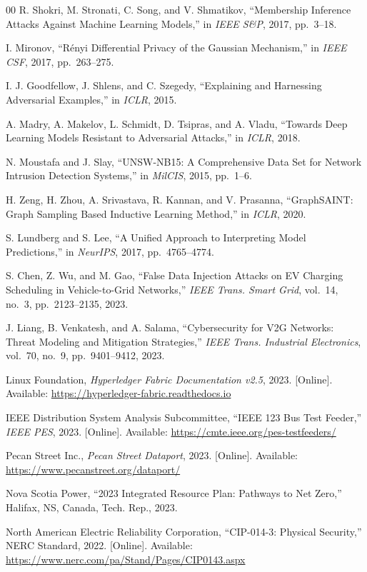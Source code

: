 \documentclass[journal]{IEEEtran}
\begin{document}
\begin{thebibliography}{00}
 R. Shokri, M. Stronati, C. Song, and V. Shmatikov, ``Membership Inference Attacks Against Machine Learning Models,'' in \textit{IEEE S\&P}, 2017, pp.~3--18.

 I. Mironov, ``R\'{e}nyi Differential Privacy of the Gaussian Mechanism,'' in \textit{IEEE CSF}, 2017, pp.~263--275.

 I. J. Goodfellow, J. Shlens, and C. Szegedy, ``Explaining and Harnessing Adversarial Examples,'' in \textit{ICLR}, 2015.

 A. Madry, A. Makelov, L. Schmidt, D. Tsipras, and A. Vladu, ``Towards Deep Learning Models Resistant to Adversarial Attacks,'' in \textit{ICLR}, 2018.

 N. Moustafa and J. Slay, ``UNSW-NB15: A Comprehensive Data Set for Network Intrusion Detection Systems,'' in \textit{MilCIS}, 2015, pp.~1--6.

 H. Zeng, H. Zhou, A. Srivastava, R. Kannan, and V. Prasanna, ``GraphSAINT: Graph Sampling Based Inductive Learning Method,'' in \textit{ICLR}, 2020.

 S. Lundberg and S. Lee, ``A Unified Approach to Interpreting Model Predictions,'' in \textit{NeurIPS}, 2017, pp.~4765--4774.

 S. Chen, Z. Wu, and M. Gao, ``False Data Injection Attacks on EV Charging Scheduling in Vehicle-to-Grid Networks,'' \textit{IEEE Trans. Smart Grid}, vol.~14, no.~3, pp.~2123--2135, 2023.

 J. Liang, B. Venkatesh, and A. Salama, ``Cybersecurity for V2G Networks: Threat Modeling and Mitigation Strategies,'' \textit{IEEE Trans. Industrial Electronics}, vol.~70, no.~9, pp.~9401--9412, 2023.

 Linux Foundation, \textit{Hyperledger Fabric Documentation v2.5}, 2023. [Online]. Available: \url{https://hyperledger-fabric.readthedocs.io}

 IEEE Distribution System Analysis Subcommittee, ``IEEE 123 Bus Test Feeder,'' \textit{IEEE PES}, 2023. [Online]. Available: \url{https://cmte.ieee.org/pes-testfeeders/}

 Pecan Street Inc., \textit{Pecan Street Dataport}, 2023. [Online]. Available: \url{https://www.pecanstreet.org/dataport/}

 Nova Scotia Power, ``2023 Integrated Resource Plan: Pathways to Net Zero,'' Halifax, NS, Canada, Tech. Rep., 2023.

 North American Electric Reliability Corporation, ``CIP-014-3: Physical Security,'' NERC Standard, 2022. [Online]. Available: \url{https://www.nerc.com/pa/Stand/Pages/CIP0143.aspx}

\end{thebibliography}
\end{document}
